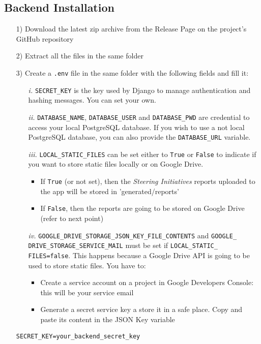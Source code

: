 \documentclass[table, 12pt]{article}
\begin{document}
\subsection{Backend Installation}
\begin{itemize}
    \item[1)] Download the latest zip archive from the Release Page on the project's GitHub repository
    \item[2)] Extract all the files in the same folder
    \item[3)] Create a \texttt{.env} file in the same folder with the following fields and fill it:
    \begin{itemize}
        \item[\textit{i.}] \texttt{SECRET\_KEY} is the key used by Django to manage authentication and hashing messages. You can set your own.
        \item[\textit{ii.}] \texttt{DATABASE\_NAME}, \texttt{DATABASE\_USER} and \texttt{DATABASE\_PWD} are credential to access your local PostgreSQL database. If you wish to use a not local PostgreSQL database, you can also provide the \texttt{DATABASE\_URL} variable.
        \item[\textit{iii.}] \texttt{LOCAL\_STATIC\_FILES} can be set either to \texttt{True} or \texttt{False} to indicate if you want to store static files locally or on Google Drive.
        \begin{itemize}
            \item If \texttt{True} (or not set), then the \emph{Steering Initiatives} reports uploaded to the app will be stored in 'generated/reports'
            \item If \texttt{False}, then the reports are going to be stored on Google Drive (refer to next point)
        \end{itemize} 
        \item[\textit{iv.}] \texttt{GOOGLE\_DRIVE\_STORAGE\_JSON\_KEY\_FILE\_CONTENTS} and \texttt{GOOGLE\_\\DRIVE\_STORAGE\_SERVICE\_MAIL} must be set if \texttt{LOCAL\_STATIC\_\\FILES=false}. This happens because a Google Drive API is going to be used to store static files. You have to:
        \begin{itemize}
            \item Create a service account on a project in Google Developers Console: this will be your service email
            \item Generate a secret service key a store it in a safe place. Copy and paste its content in the JSON Key variable
        \end{itemize}      
    \end{itemize}
    \begin{lstlisting}[language=shell]
SECRET_KEY=your_backend_secret_key


\end{lstlisting}
\end{itemize}
\end{document}
